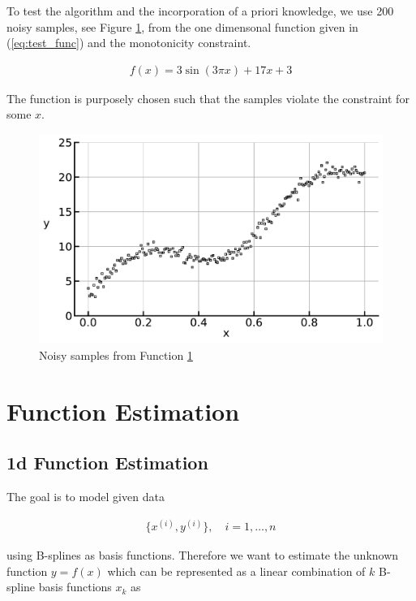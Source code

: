 \documentclass[10pt,a4paper]{report}
\begin{document}
To test the algorithm and the incorporation of a priori knowledge, we use 200 noisy samples, see Figure \ref{fig:test_func}, from the one dimensonal function given in (\ref{eq:test_func}) and the monotonicity constraint. 

\begin{align}\label{eq:test_func}
	f(x) = 3\sin(3\pi x) + 17x + 3
\end{align}

The function is purposely chosen such that the samples violate the constraint for some $x$. 

\begin{figure}[H]
	\centering
	\includegraphics[width=\columnwidth]{../thesisplots/test_func.pdf}
	\caption{Noisy samples from Function \ref{fig:test_func}}
	\label{fig:test_func}
\end{figure}

\section{Function Estimation}

\subsection{1d Function Estimation} \label{1D}

The goal is to model given data

\begin{align} \label{eq:data}
	\{x^{(i)}, y^{(i)}\}, \quad i = 1, \dots, n 
\end{align}

using B-splines as basis functions. Therefore we want to estimate the unknown function $y = f(x)$ which can be represented as a linear combination of $k$ B-spline basis functions $x_k$ as
\end{document}
